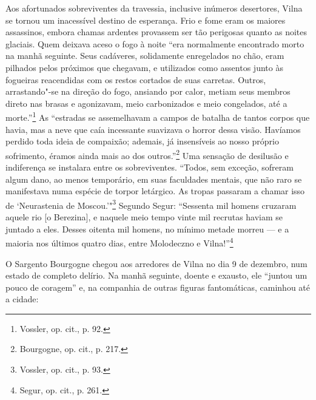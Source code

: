 Aos afortunados sobreviventes da travessia, inclusive inúmeros
desertores, Vilna se tornou um inacessível destino de esperança. Frio e
fome eram os maiores assassinos, embora chamas ardentes provassem ser
tão perigosas quanto as noites glaciais. Quem deixava aceso o fogo à
noite ``era normalmente encontrado morto na manhã seguinte. Seus
cadáveres, solidamente enregelados no chão, eram pilhados pelos próximos
que chegavam, e utilizados como assentos junto às fogueiras reacendidas
com os restos cortados de suas carretas. Outros, arrastando"-se na
direção do fogo, ansiando por calor, metiam seus membros direto nas
brasas e agonizavam, meio carbonizados e meio congelados, até a
morte.''\footnote{Vossler, op. cit., p. 92.} As ``estradas se
assemelhavam a campos de batalha de tantos corpos que havia, mas a neve
que caía incessante suavizava o horror dessa visão. Havíamos perdido
toda ideia de compaixão; ademais, já insensíveis ao nosso próprio
sofrimento, éramos ainda mais ao dos outros.''\footnote{Bourgogne, op.
  cit., p. 217.} Uma sensação de desilusão e indiferença se instalara
entre os sobreviventes. ``Todos, sem exceção, sofreram algum dano, ao
menos temporário, em suas faculdades mentais, que não raro se
manifestava numa espécie de torpor letárgico. As tropas passaram a
chamar isso de `Neurastenia de Moscou.'"\footnote{Vossler, op. cit., p. 93.} Segundo Segur: ``Sessenta mil homens cruzaram aquele rio {[}o Berezina{]}, e naquele meio tempo vinte mil recrutas haviam se juntado a
eles. Desses oitenta mil homens, no mínimo metade morreu --- e a maioria
nos últimos quatro dias, entre Molodeczno e Vilna!''\footnote{Segur, op. cit., p. 261.}
%

O Sargento Bourgogne chegou aos arredores de Vilna no dia 9 de dezembro,
num estado de completo delírio. Na manhã seguinte, doente e exausto, ele
``juntou um pouco de coragem'' e, na companhia de outras figuras
fantomáticas, caminhou até a cidade:

